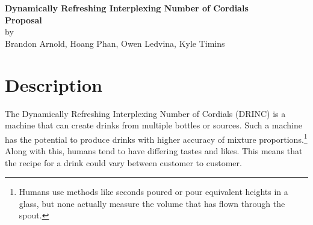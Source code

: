 \documentclass[letterpaper]{scrreprt}
\newcommand{\theTitle}{Dynamically Refreshing Interplexing Number of Cordials}
\newcommand{\subTitle}{DRINC}
\newcommand{\fNames}{Brandon Arnold, Hoang Phan, Owen Ledvina, Kyle Timins}
\begin{document}
\thispagestyle{plain}
\begin{center}
{\LARGE \textbf{\theTitle}}\\\vspace{0.5cm}
{\Large \textbf{Proposal}}\\\vspace{0.5cm}
by\\
{\large \fNames}

\end{center}

\section{Description}
The \theTitle{} (\subTitle{}) is a machine that can create drinks from
multiple bottles or sources. Such a machine has the potential to produce
drinks with higher accuracy of mixture proportions.\footnote{Humans use
methods like seconds poured or pour equivalent heights in a glass, but 
none actually measure the volume that has flown through the spout.} Along
with this, humans tend to have differing tastes and likes. This means
that the recipe for a drink could vary between customer to customer.
\end{document}
